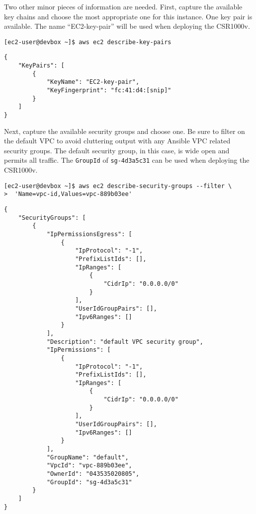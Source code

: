 Two other minor pieces of information are needed. First, capture the available
key chains and choose the most appropriate one for this instance. One key pair
is available. The name ``EC2-key-pair'' will be used when deploying the CSR1000v.

\begin{verbatim}
[ec2-user@devbox ~]$ aws ec2 describe-key-pairs
\end{verbatim}

\begin{verbatim}
{
    "KeyPairs": [
        {
            "KeyName": "EC2-key-pair", 
            "KeyFingerprint": "fc:41:d4:[snip]"
        }
    ]
}
\end{verbatim}

Next, capture the available security groups and choose one. Be sure to filter
on the default VPC to avoid cluttering output with any Ansible VPC related
security groups. The default security group, in this case, is wide open and
permits all traffic. The \verb|GroupId| of \verb|sg-4d3a5c31| can be used
when deploying the CSR1000v.

\begin{verbatim}
[ec2-user@devbox ~]$ aws ec2 describe-security-groups --filter \
>  'Name=vpc-id,Values=vpc-889b03ee'
\end{verbatim}

\begin{verbatim}
{
    "SecurityGroups": [
        {
            "IpPermissionsEgress": [
                {
                    "IpProtocol": "-1", 
                    "PrefixListIds": [], 
                    "IpRanges": [
                        {
                            "CidrIp": "0.0.0.0/0"
                        }
                    ], 
                    "UserIdGroupPairs": [], 
                    "Ipv6Ranges": []
                }
            ], 
            "Description": "default VPC security group", 
            "IpPermissions": [
                {
                    "IpProtocol": "-1", 
                    "PrefixListIds": [], 
                    "IpRanges": [
                        {
                            "CidrIp": "0.0.0.0/0"
                        }
                    ], 
                    "UserIdGroupPairs": [], 
                    "Ipv6Ranges": []
                }
            ], 
            "GroupName": "default", 
            "VpcId": "vpc-889b03ee", 
            "OwnerId": "043535020805", 
            "GroupId": "sg-4d3a5c31"
        }
    ]
}
\end{verbatim}

